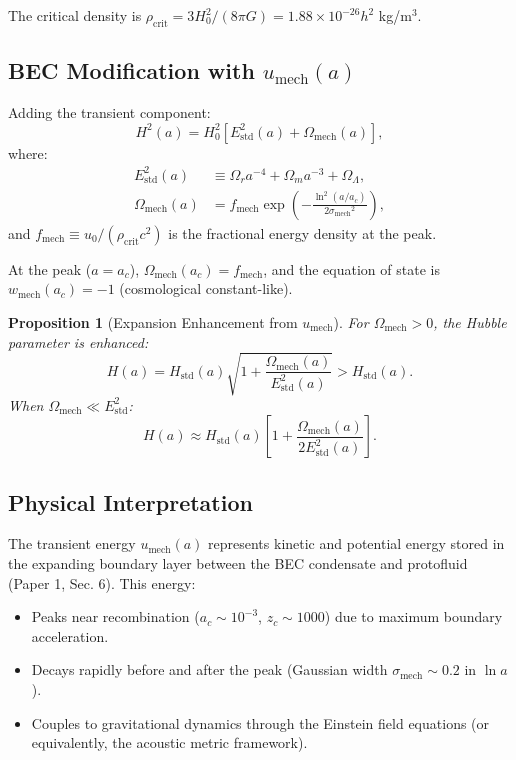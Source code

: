 \documentclass[11pt,a4paper]{article}
\newcommand{\rhocrit}{\ensuremath{\rho_{\mathrm{crit}}}}
\newcommand{\umech}{\ensuremath{u_{\mathrm{mech}}}}
\newcommand{\wmech}{\ensuremath{w_{\mathrm{mech}}}}
\newcommand{\fmech}{\ensuremath{f_{\mathrm{mech}}}}
\newcommand{\ac}{\ensuremath{a_c}}
\newcommand{\sigmamech}{\ensuremath{\sigma_{\mathrm{mech}}}}
\newcommand{\Omm}{\ensuremath{\Omega_m}}
\newcommand{\Omr}{\ensuremath{\Omega_r}}
\newcommand{\OmL}{\ensuremath{\Omega_\Lambda}}
\newtheorem{proposition}[theorem]{Proposition}
\theoremstyle{definition}
\theoremstyle{remark}
\begin{document}
The critical density is $\rhocrit = 3H_0^2/(8\pi G) = 1.88 \times 10^{-26} h^2$ kg/m$^3$.

\subsection{BEC Modification with $\umech(a)$}
\label{sec:bec_modification}

Adding the transient component:
\begin{equation}
H^2(a) = H_0^2 \left[ E_{\mathrm{std}}^2(a) + \Omega_{\mathrm{mech}}(a) \right],
\end{equation}
where:
\begin{align}
E_{\mathrm{std}}^2(a) &\equiv \Omr a^{-4} + \Omm a^{-3} + \OmL, \\
\Omega_{\mathrm{mech}}(a) &= \fmech \exp\left( -\frac{\ln^2(a/\ac)}{2\sigmamech^2} \right),
\end{align}
and $\fmech \equiv u_0/(\rhocrit c^2)$ is the fractional energy density at the peak.

At the peak ($a = \ac$), $\Omega_{\mathrm{mech}}(\ac) = \fmech$, and the equation of state is $\wmech(\ac) = -1$ (cosmological constant-like).

\begin{proposition}[Expansion Enhancement from $\umech$]
\label{prop:expansion_enhancement}
For $\Omega_{\mathrm{mech}} > 0$, the Hubble parameter is enhanced:
\begin{equation}
H(a) = H_{\mathrm{std}}(a) \sqrt{1 + \frac{\Omega_{\mathrm{mech}}(a)}{E_{\mathrm{std}}^2(a)}} > H_{\mathrm{std}}(a).
\end{equation}
When $\Omega_{\mathrm{mech}} \ll E_{\mathrm{std}}^2$:
\begin{equation}
H(a) \approx H_{\mathrm{std}}(a) \left[ 1 + \frac{\Omega_{\mathrm{mech}}(a)}{2E_{\mathrm{std}}^2(a)} \right].
\end{equation}
\end{proposition}

\subsection{Physical Interpretation}
\label{sec:physical_interpretation}

The transient energy $\umech(a)$ represents kinetic and potential energy stored in the expanding boundary layer between the BEC condensate and protofluid (Paper 1, Sec. 6). This energy:
\begin{itemize}[leftmargin=*, itemsep=0.2em]
\item Peaks near recombination ($\ac \sim 10^{-3}$, $z_c \sim 1000$) due to maximum boundary acceleration.
\item Decays rapidly before and after the peak (Gaussian width $\sigmamech \sim 0.2$ in $\ln a$).
\item Couples to gravitational dynamics through the Einstein field equations (or equivalently, the acoustic metric framework).
\end{itemize}
\end{document}
